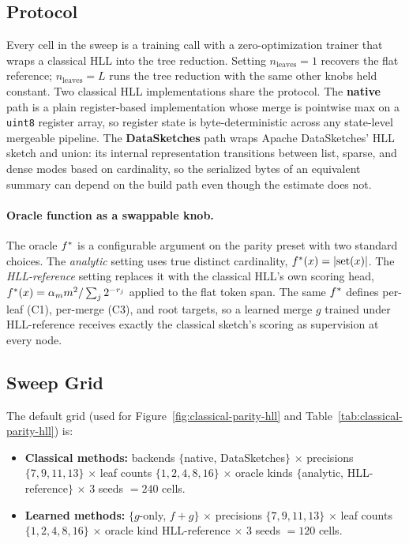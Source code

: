 \subsection{Protocol}

Every cell in the sweep is a training call with a zero-optimization
trainer that wraps a classical HLL into the tree reduction. Setting
$n_{\mathrm{leaves}} = 1$ recovers the flat reference;
$n_{\mathrm{leaves}} = L$ runs the tree reduction with the same
other knobs held constant. Two classical HLL implementations share
the protocol. The \textbf{native} path is a plain register-based
implementation whose merge is pointwise max on a \texttt{uint8}
register array, so register state is byte-deterministic across any
state-level mergeable pipeline. The \textbf{DataSketches} path wraps
Apache DataSketches' HLL sketch and union: its internal representation
transitions between list, sparse, and dense modes based on cardinality,
so the serialized bytes of an equivalent summary can depend on the
build path even though the estimate does not.

\paragraph{Oracle function as a swappable knob.}
The oracle $f^\ast$ is a configurable argument on the parity preset
with two standard choices. The \emph{analytic} setting uses true
distinct cardinality, $f^\ast(x) = |\mathrm{set}(x)|$. The
\emph{HLL-reference} setting replaces it with the classical HLL's own
scoring head, $f^\ast(x) = \alpha_m m^2 / \sum_j 2^{-r_j}$ applied to
the flat token span. The same $f^\ast$ defines per-leaf (C1),
per-merge (C3), and root targets, so a learned merge $g$ trained under
HLL-reference receives exactly the classical sketch's scoring as
supervision at every node.

\subsection{Sweep Grid}

The default grid (used for Figure~\ref{fig:classical-parity-hll} and
Table~\ref{tab:classical-parity-hll}) is:

\begin{itemize}
\item \textbf{Classical methods:} backends $\{$native, DataSketches$\}$ $\times$ precisions $\{7, 9, 11, 13\}$ $\times$ leaf counts $\{1, 2, 4, 8, 16\}$ $\times$ oracle kinds $\{$analytic, HLL-reference$\}$ $\times$ $3$ seeds $= 240$ cells.
\item \textbf{Learned methods:} $\{g$-only, $f{+}g\}$ $\times$ precisions $\{7, 9, 11, 13\}$ $\times$ leaf counts $\{1, 2, 4, 8, 16\}$ $\times$ oracle kind HLL-reference $\times$ $3$ seeds $= 120$ cells.
\end{itemize}

